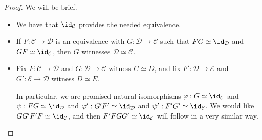 \documentclass[../notes.tex]{subfiles}
\begin{document}
\begin{proof}
	We will be brief.
	\begin{itemize}
		\item We have that $\id_\mathcal C$ provides the needed equivalence.
		\item If $F:\mathcal C\to\mathcal D$ is an equivalence with $G:\mathcal D\to\mathcal C$ such that $FG\simeq\id_\mathcal D$ and $GF\simeq\id_\mathcal C$, then $G$ witnesses $\mathcal D\simeq\mathcal C$.
		\item Fix $F:\mathcal C\to\mathcal D$ and $G:\mathcal D\to\mathcal C$ witness $C\simeq D$, and fix $F':\mathcal D\to\mathcal E$ and $G':\mathcal E\to\mathcal D$ witness $D\simeq E$.

		In particular, we are promised natural isomorphisms $\varphi:G\simeq\id_\mathcal C$ and $\psi:FG\simeq\id_\mathcal D$ and $\varphi':G'F'\simeq\id_\mathcal D$ and $\psi':F'G'\simeq\id_\mathcal E$. We would like $GG'F'F\simeq\id_\mathcal C$, and then $F'FGG'\simeq\id_\mathcal E$ will follow in a very similar way.


\end{itemize}
\end{proof}
\end{document}
